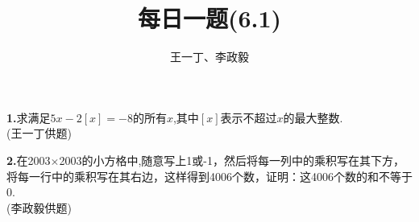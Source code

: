 \documentclass[UTF8]{ctexart}
\title{每日一题(6.1)}
\author{王一丁、李政毅}
\begin{document}
\maketitle
\textbf{1.}求满足$ 5x-2[x]=-8 $的所有$ x $,其中$ [x] $表示不超过$ x $的最大整数.\\
{(王一丁供题)}\\
\par\textbf{2.}在2003$ \times $2003的小方格中,随意写上1或-1，然后将每一列中的乘积写在其下方，将每一行中的乘积写在其右边，这样得到4006个数，证明：这4006个数的和不等于0.\\
{(李政毅供题)}
\end{document}
